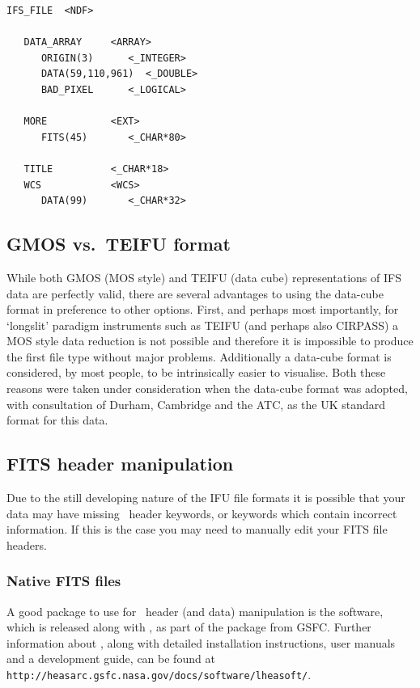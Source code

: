 \documentclass[twoside,11pt]{article}
\newcommand{\htmladdnormallink}[2]{#1}
\newcommand{\xlabel}[1]{}
\newcommand{\latex}[1]{#1}
\begin{document}
\small\begin{verbatim}
IFS_FILE  <NDF>

   DATA_ARRAY     <ARRAY>
      ORIGIN(3)      <_INTEGER>
      DATA(59,110,961)  <_DOUBLE>
      BAD_PIXEL      <_LOGICAL>  

   MORE           <EXT>
      FITS(45)       <_CHAR*80>

   TITLE          <_CHAR*18> 
   WCS            <WCS>      
      DATA(99)       <_CHAR*32>
\end{verbatim}\normalsize

\subsection{\xlabel{sc16_fits2ndf}GMOS vs.\ TEIFU format\label{sc16_fits2ndf}}

While both GMOS (MOS style) and TEIFU (data cube) representations of
IFS data are perfectly valid, there are several advantages to using the
data-cube format in preference to other options.  First, and perhaps
most importantly, for `longslit' paradigm instruments such as TEIFU
(and perhaps also CIRPASS) a MOS style data reduction is not possible
and therefore it is impossible to produce the first file type without
major problems.  Additionally a data-cube format is considered, by most
people, to be intrinsically easier to visualise.  Both these reasons
were taken under consideration when the data-cube format was adopted,
with consultation of Durham, Cambridge and the ATC, as the UK standard
format for this data.

\subsection{\xlabel{sc16_fitshdr}FITS header manipulation\label{sc16_fitshdr}}

Due to the still developing nature of the IFU file formats it is
possible that your data may have missing \FITSref\  header keywords, or
keywords which contain incorrect information.  If this is the case you
may need to manually edit your FITS file headers.

\subsubsection{Native FITS files}
 
A good package to use for \FITSref\ header (and data) manipulation is the
\htmladdnormallink{\FTOOLS}{
http://heasarc.gsfc.nasa.gov/docs/software/lheasoft/ftools/} software,
which is released along with
\htmladdnormallink{\XANADU}{http://heasarc.gsfc.nasa.gov/docs/software/lheasoft/xanadu/},
as part of the
\htmladdnormallink{\HEASOFT}{http://heasarc.gsfc.nasa.gov/docs/software/lheasoft/}
package from GSFC.\latex{ Further information about \HEASOFT, along
with detailed installation instructions, user manuals and a
development guide, can be found at {\tt
http://heasarc.gsfc.nasa.gov/docs/software/lheasoft/}.}
\end{document}
